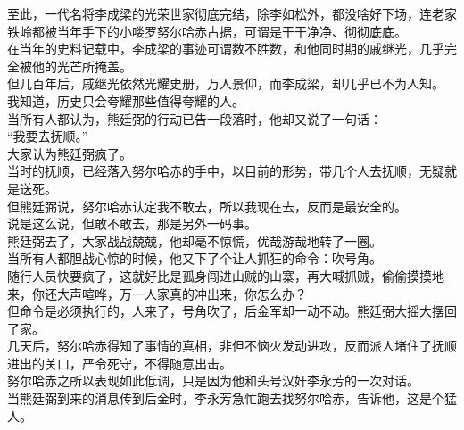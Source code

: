 \begin{multicols}{\theparacolNo}
至此，一代名将李成梁的光荣世家彻底完结，除李如松外，都没啥好下场，连老家铁岭都被当年手下的小喽罗努尔哈赤占据，可谓是干干净净、彻彻底底。\\

在当年的史料记载中，李成梁的事迹可谓数不胜数，和他同时期的戚继光，几乎完全被他的光芒所掩盖。\\

但几百年后，戚继光依然光耀史册，万人景仰，而李成梁，却几乎已不为人知。\\

我知道，历史只会夸耀那些值得夸耀的人。\\

当所有人都认为，熊廷弼的行动已告一段落时，他却又说了一句话：\\

“我要去抚顺。”\\

大家认为熊廷弼疯了。\\

当时的抚顺，已经落入努尔哈赤的手中，以目前的形势，带几个人去抚顺，无疑就是送死。\\

但熊廷弼说，努尔哈赤认定我不敢去，所以我现在去，反而是最安全的。\\

说是这么说，但敢不敢去，那是另外一码事。\\

熊廷弼去了，大家战战兢兢，他却毫不惊慌，优哉游哉地转了一圈。\\

当所有人都胆战心惊的时候，他又下了个让人抓狂的命令：吹号角。\\

随行人员快要疯了，这就好比是孤身闯进山贼的山寨，再大喊抓贼，偷偷摸摸地来，你还大声喧哗，万一人家真的冲出来，你怎么办？\\

但命令是必须执行的，人来了，号角吹了，后金军却一动不动。熊廷弼大摇大摆回了家。\\

几天后，努尔哈赤得知了事情的真相，非但不恼火发动进攻，反而派人堵住了抚顺进出的关口，严令死守，不得随意出击。\\

努尔哈赤之所以表现如此低调，只是因为他和头号汉奸李永芳的一次对话。\\

当熊廷弼到来的消息传到后金时，李永芳急忙跑去找努尔哈赤，告诉他，这是个猛人。\\


\end{multicols}
